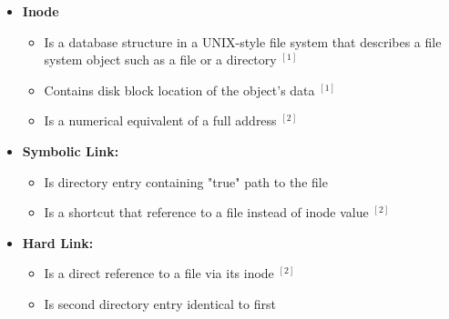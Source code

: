 \documentclass[12pt]{article}
\begin{document}
\begin{itemize}
    \begin{itemize}
        \item \textbf{Inode}
        \begin{itemize}
            \item Is a database structure in a UNIX-style file system that describes
            a file system object such as a file or a directory $^{[1]}$
            \item Contains disk block location of the object's data $^{[1]}$
            \item Is a numerical equivalent of a full address $^{[2]}$
        \end{itemize}
        \item \textbf{Symbolic Link:}
        \begin{itemize}
            \item Is directory entry containing "true" path to the file
            \item Is a shortcut that reference to a file instead of inode value $^{[2]}$
        \end{itemize}
        \item \textbf{Hard Link:}
        \begin{itemize}
            \item Is a direct reference to a file via its inode $^{[2]}$
            \item Is second directory entry identical to first
        \end{itemize}
    \end{itemize}


\end{itemize}
\end{document}

